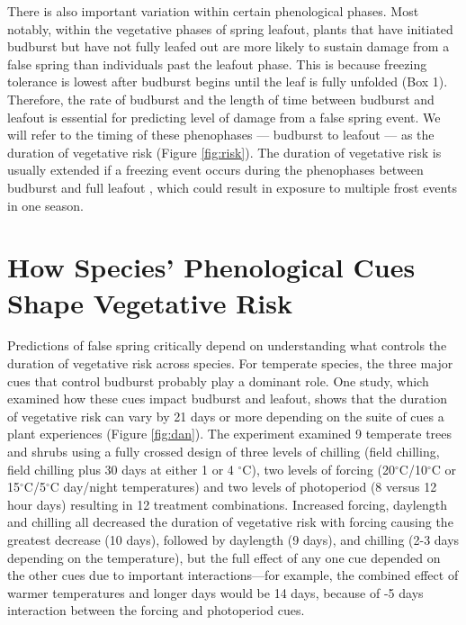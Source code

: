 \documentclass{article}\usepackage[]{graphicx}\usepackage[]{color}
\begin{document}
There is also important variation within certain phenological phases. Most notably, within the vegetative phases of spring leafout, plants that have initiated budburst but have not fully leafed out are more likely to sustain damage from a false spring than individuals past the leafout phase. This is because freezing tolerance is lowest after budburst begins until the leaf is fully unfolded \citep{Lenz2016} (Box 1). Therefore, the rate of budburst and the length of time between budburst and leafout is essential for predicting level of damage from a false spring event. We will refer to the timing of these phenophases --- budburst to leafout --- as the duration of vegetative risk (Figure \ref{fig:risk}). The duration of vegetative risk is usually extended if a freezing event occurs during the phenophases between budburst and full leafout \citep{Augspurger2009}, which could result in exposure to multiple frost events in one season.

\section {How Species' Phenological Cues Shape Vegetative Risk}
Predictions of false spring critically depend on understanding what controls the duration of vegetative risk across species. For temperate species, the three major cues that control budburst \citep%
{Chuine2010} probably play a dominant role. One study, which examined how these cues impact budburst and leafout, shows that the duration of vegetative risk can vary by 21 days or more depending on the suite of cues a plant experiences (Figure \ref{fig:dan}). The experiment examined 9 temperate trees and shrubs using a fully crossed design of three levels of chilling (field chilling, field chilling plus 30 days at either 1 or 4 $^{\circ}$C), two levels of forcing (20$^{\circ}$C/10$^{\circ}$C or 15$^{\circ}$C/5$^{\circ}$C day/night temperatures) and two levels of photoperiod (8 versus 12 hour days) resulting in 12 treatment combinations. Increased forcing, daylength and chilling all decreased the duration of vegetative risk with forcing causing the greatest decrease (10 days), followed by daylength (9 days), and chilling (2-3 days depending on the temperature), but the full effect of any one cue depended on the other cues due to important interactions---for example, the combined effect of warmer temperatures and longer days would be 14 days, because of -5 days interaction between the forcing and photoperiod cues. 
\end{document}
